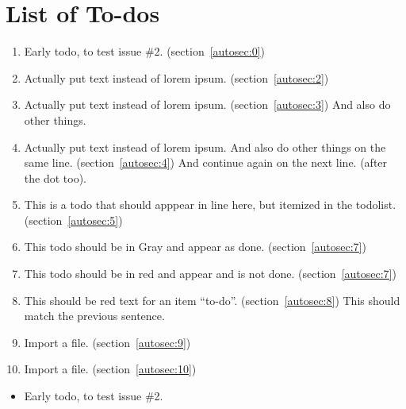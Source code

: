 \section{List of To-dos}
    \begin{enumerate}[noitemsep]
        \item {\color{red}Early todo, to test issue \#2.} (section~\ref{autosec:0})
        \item {\color{red}Actually put text instead of lorem ipsum.} (section~\ref{autosec:2})
        \item {\color{red}Actually put text instead of lorem ipsum.} (section~\ref{autosec:3})
{\color{red}And also do other things.}
        \item {\color{red}Actually put text instead of lorem ipsum. And also do other things on the same line.} (section~\ref{autosec:4})
{\color{red}And continue again on the next line. (after the dot too).}
        \item {\color{red}This is a todo that should apppear in line here, but itemized in the todolist.} (section~\ref{autosec:5})
        \item {\color{Gray}This todo should be in Gray and appear as done.} (section~\ref{autosec:7})
        \item {\color{red}This todo should be in red and appear and is not done.} (section~\ref{autosec:7})
        \item {\color{red}This should be red text for an item ``to-do''.} (section~\ref{autosec:8})
{\color{red}This should match the previous sentence.}
        \item {\color{red}Import a file.} (section~\ref{autosec:9})
        \item {\color{red}Import a file.} (section~\ref{autosec:10})
    \end{enumerate}

    \begin{itemize}[noitemsep]
        \item {\color{red}Early todo, to test issue \#2.}
    \end{itemize}
